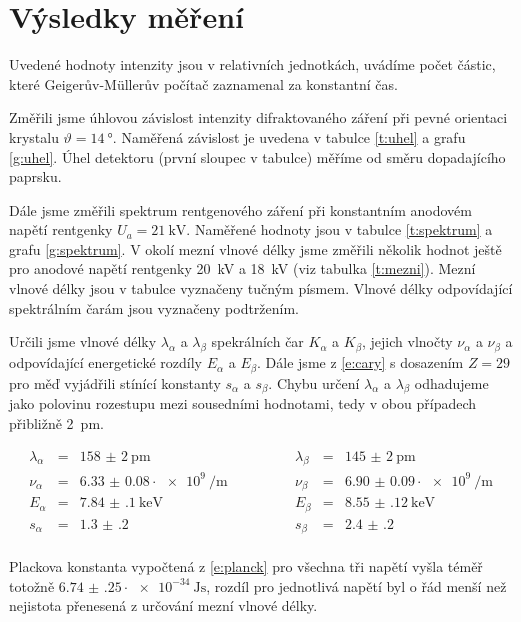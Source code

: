 \section*{Výsledky měření}
Uvedené hodnoty intenzity jsou v relativních jednotkách, uvádíme počet částic, které Geigerův-Müllerův počítač zaznamenal za konstantní čas.


Změřili jsme úhlovou závislost intenzity difraktovaného záření při pevné orientaci krystalu $\vartheta = \SI{14}{\degree}$. Naměřená závislost je uvedena v tabulce \ref{t:uhel} a grafu \ref{g:uhel}. Úhel detektoru (první sloupec v tabulce) měříme od směru dopadajícího paprsku.


Dále jsme změřili spektrum rentgenového záření při konstantním anodovém napětí rentgenky $U_a=\SI{21}{\kV}$. Naměřené hodnoty jsou v tabulce \ref{t:spektrum} a grafu \ref{g:spektrum}. V okolí mezní vlnové délky jsme změřili několik hodnot ještě pro anodové napětí rentgenky \SI{20}{\kV} a \SI{18}{\kV} (viz tabulka \ref{t:mezni}). Mezní vlnové délky jsou v tabulce vyznačeny tučným písmem. Vlnové délky odpovídající spektrálním čarám jsou vyznačeny podtržením.


Určili jsme vlnové délky $\lambda_\alpha$ a $\lambda_\beta$ spekrálních čar $K_\alpha$ a $K_\beta$, jejich vlnočty $\nu_\alpha$ a $\nu_\beta$ a odpovídající energetické rozdíly $E_\alpha$ a $E_\beta$. Dále jsme z \eqref{e:cary} s dosazením $Z=29$ pro měď vyjádřili stínící konstanty $s_\alpha$ a $s_\beta$. Chybu určení $\lambda_\alpha$ a $\lambda_\beta$ odhadujeme jako polovinu rozestupu mezi sousedními hodnotami, tedy v obou případech přibližně \SI{2}{\pico\metre}.

\begin{equation} \label{e:vysledky}
\begin{array}{rclrcl}
\lambda_\alpha & = & \SI{158(2)}{\pico\metre} \qquad \qquad & \lambda_\beta & = & \SI{145(2)}{\pico\metre} \\
\nu_\alpha & = & \num{6.33(8)} \cdot \SI{e9}{\per\metre} \qquad \qquad & \nu_\beta & = & \num{6.90(9)} \cdot \SI{e9}{\per\metre}\\
E_\alpha & = & \SI{7.84(10)}{\keV} \qquad \qquad & E_\beta & = & \SI{8.55(12)}{\keV} \\
s_\alpha & = & \num{1.3(2)} \qquad \qquad & s_\beta & = & \num{2.4(2)} \\
\end{array}
\end{equation}

Plackova konstanta vypočtená z \eqref{e:planck} pro všechna tři napětí vyšla téměř totožně $\num{6.74(25)}\cdot \SI{e-34}{\joule\s}$, rozdíl pro jednotlivá napětí byl o řád menší než nejistota přenesená z určování mezní vlnové délky.


